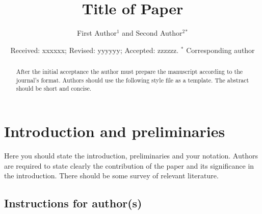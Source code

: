 \documentclass[12pt, reqno]{amsart}
\theoremstyle{definition}
\theoremstyle{remark}
\numberwithin{equation}{section}
\begin{document}
\setcounter{page}{1}




\centerline{}

\centerline{}

\title[Short Title]{Title of Paper}

\author[F. Author, S. Author]{First Author$^1$ and Second Author$^2$$^{*}$}

\address{$^{1}$ Department of Mathematics, University of California, San Diego, USA.}
\email{\textcolor[rgb]{0.00,0.00,0.84}{first@amcs.org}}

\address{$^{2}$ Department of Statistics, Moscow State University, Moscow, Russia}
\email{\textcolor[rgb]{0.00,0.00,0.84}{second@amcs.org}}




\date{Received: xxxxxx; Revised: yyyyyy; Accepted: zzzzzz.
\newline \indent $^{*}$ Corresponding author}

\begin{abstract}
After the initial acceptance the author must prepare the manuscript according to the journal's format. Authors should use the following style file as a template. The abstract should be short and concise.
\end{abstract} \maketitle

\section{Introduction and preliminaries}

\noindent Here you should state the introduction, preliminaries and
your notation. Authors are required to state clearly the
contribution of the paper and its significance in the introduction.
There should be some survey of relevant literature.

\subsection{Instructions for author(s)}
\end{document}
